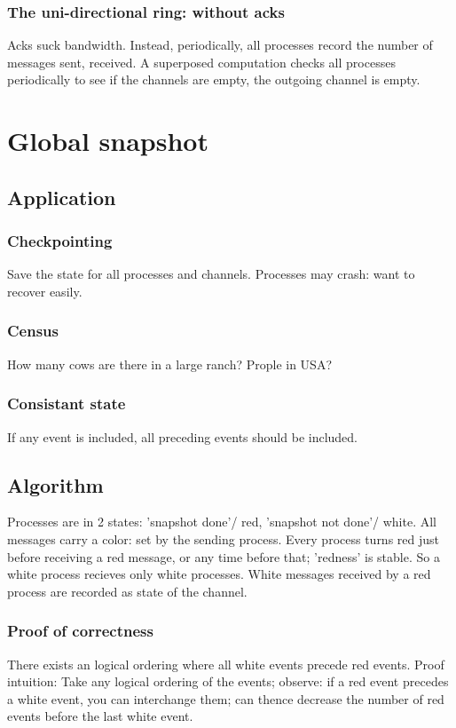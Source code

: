 \documentclass[oneside, article]{memoir}
\begin{document}
\subsubsection{The uni-directional ring: without acks}
Acks suck bandwidth. Instead, periodically, all processes record the number of messages sent, received. A superposed computation checks all processes periodically to see if the channels are empty, the outgoing channel is empty.

\section{Global snapshot}
\subsection{Application}
\subsubsection{Checkpointing}
Save the state for all processes and channels. Processes may crash: want to recover easily.

\subsubsection{Census}
How many cows are there in a large ranch? Prople in USA?

\subsubsection{Consistant state}
If any event is included, all preceding events should be included.

\subsection{Algorithm}
Processes are in 2 states: 'snapshot done'/ red, 'snapshot not done'/ white. All messages carry a color: set by the sending process. Every process turns red just before receiving a red message, or any time before that; 'redness' is stable. So a white process recieves only white processes. White messages received by a red process are recorded as state of the channel.

\subsubsection{Proof of correctness}
There exists an logical ordering where all white events precede red events. Proof intuition: Take any logical ordering of the events; observe: if a red event precedes a white event, you can interchange them; can thence decrease the number of red events before the last white event.
\end{document}
